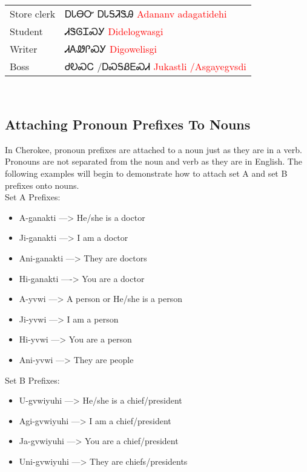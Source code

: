 \vfill\newpage\begin{minipage}{\linewidth}\begin{tabular}{p{5cm} p{9cm}}
Store clerk & ᎠᏓᎾᏅ ᎠᏓᎦᏘᏕᎯ 
 \newline \textcolor{red}{Adananv adagatidehi}\\
Student & ᏗᏕᎶᏆᏍᎩ 
 \newline \textcolor{red}{Didelogwasgi}\\
Writer & ᏗᎪᏪᎵᏍᎩ 
 \newline \textcolor{red}{Digowelisgi}\\
Boss & ᏧᎧᏍᏟ /ᎠᏍᎦᏰᎬᏍᏗ 
 \newline \textcolor{red}{Jukastli /Asgayegvsdi}\\
\end{tabular}
\end{minipage}

\
\subsection{Attaching Pronoun Prefixes To Nouns}
In Cherokee, pronoun prefixes are attached to a noun just as they are in a verb. Pronouns are not separated from the noun and verb as they are in English. The following examples will begin to demonstrate how to attach set A and set B prefixes onto nouns.\cite{walcpp53}\\
\newline \noindent Set A Prefixes:\begin{itemize}
\item A-ganakti —> He/she is a doctor
\item Ji-ganakti —> I am a doctor
\item Ani-ganakti —> They are doctors
\item Hi-ganakti —-> You are a doctor
\item A-yvwi —> A person or He/she is a person
\item Ji-yvwi —> I am a person
\item Hi-yvwi —> You are a person
\item Ani-yvwi —> They are people
\end{itemize}

\noindent Set B Prefixes:
\begin{itemize}
\item U-gvwiyuhi —> He/she is a chief/president
\item Agi-gvwiyuhi —> I am a chief/president
\item Ja-gvwiyuhi —> You are a chief/president
\item Uni-gvwiyuhi —> They are chiefs/presidents
\end{itemize}
\index{}
